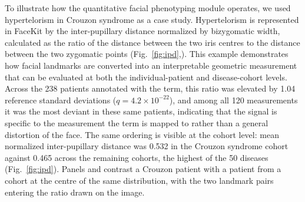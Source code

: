 \documentclass[11pt]{article}
\begin{document}

To illustrate how the quantitative facial phenotyping module operates, we used hypertelorism in Crouzon syndrome as a case study. Hypertelorism is represented in FaceKit by the inter-pupillary distance normalized by bizygomatic width, calculated as the ratio of the distance between the two iris centres to the distance between the two zygomatic points (Fig.~\ref{fig:ipd},). This example demonstrates how facial landmarks are converted into an interpretable geometric measurement that can be evaluated at both the individual-patient and disease-cohort levels. Across the 238 patients annotated with the term,
this ratio was elevated by 1.04 reference standard deviations
($q=4.2\times10^{-22}$), and among all 120 measurements it was the most
deviant in these same patients, indicating that the signal is specific to the
measurement the term is mapped to rather than a general distortion of the face.
The same ordering is visible at the cohort level: mean normalized inter-pupillary
distance was 0.532 in the Crouzon syndrome cohort against 0.465 across the
remaining cohorts, the highest of the 50 diseases (Fig.~\ref{fig:ipd}). Panels  and  contrast a Crouzon patient with a patient from a cohort at the centre of the same
distribution, with the two landmark pairs entering the ratio drawn on the image.
\end{document}
